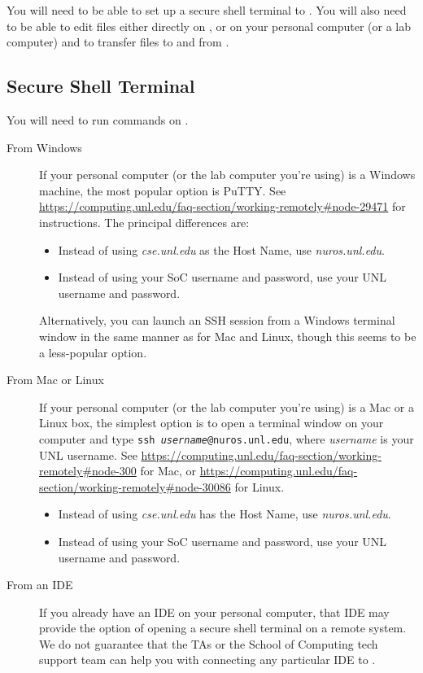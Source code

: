 

You will need to be able to set up a secure shell terminal to \runtimeenvironment.
You will also need to be able to edit files either directly on \runtimeenvironment, or on your personal computer (or a lab computer) and to transfer files to and from \runtimeenvironment.

\subsection{Secure Shell Terminal}

You will need to run commands on \runtimeenvironment.

\begin{description}
    \item[From Windows] If your personal computer (or the lab computer you're using) is a Windows machine, the most popular option is PuTTY\@.
        See \url{https://computing.unl.edu/faq-section/working-remotely#node-29471} for instructions.
        The principal differences are:
        \begin{itemize}
            \item Instead of using \textit{cse.unl.edu} as the Host Name, use \textit{nuros.unl.edu}.
            \item Instead of using your SoC username and password, use your UNL username and password.
        \end{itemize}
        Alternatively, you can launch an SSH session from a Windows terminal window in the same manner as for Mac and Linux, though this seems to be a less-popular option.
    \item[From Mac or Linux] If your personal computer (or the lab computer you're using) is a Mac or a Linux box, the simplest option is to open a terminal window on your computer and type \texttt{ssh \textit{username}@nuros.unl.edu}, where \textit{username} is your UNL username.
        See \url{https://computing.unl.edu/faq-section/working-remotely#node-300} for Mac, or \url{https://computing.unl.edu/faq-section/working-remotely#node-30086} for Linux.
        \begin{itemize}
            \item Instead of using \textit{cse.unl.edu} has the Host Name, use \textit{nuros.unl.edu}.
            \item Instead of using your SoC username and password, use your UNL username and password.
        \end{itemize}
    \item[From an IDE] If you already have an IDE on your personal computer, that IDE may provide the option of opening a secure shell terminal on a remote system.
        We do not guarantee that the TAs or the School of Computing tech support team can help you with connecting any particular IDE to \runtimeenvironment.
\end{description}


